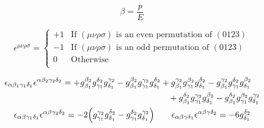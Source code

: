 \begin{equation*}
        \beta = \frac{p}{E}
\end{equation*}

\begin{equation*}
        \epsilon^{\mu\nu\rho\sigma} = \begin{cases}
                +1 &\text{If $(\mu\nu\rho\sigma)$ is an even permutation of $(0123)$} \\
                -1 &\text{If $(\mu\nu\rho\sigma)$ is an odd permutation of $(0123)$} \\
                0  &\text{Otherwise} \\
        \end{cases}
\end{equation*}

\begin{gather*}
    \begin{multlined}
        \epsilon_{\alpha\beta_1\gamma_1\delta_1}\epsilon^{\alpha\beta_2\gamma_2\delta_2}
        =
        + g^{\beta_2}_{\beta_1}g^{\delta_2}_{\gamma_1}g^{\gamma_2}_{\delta_1}
        - g^{\beta_2}_{\beta_1}g^{\gamma_2}_{\gamma_1}g^{\delta_2}_{\delta_1}
        + g^{\gamma_2}_{\beta_1}g^{\beta_2}_{\gamma_1}g^{\delta_2}_{\delta_1}
        - g^{\gamma_2}_{\beta_1}g^{\delta_2}_{\gamma_1}g^{\beta_2}_{\delta_1}
        \\
        + g^{\delta_2}_{\beta_1}g^{\gamma_2}_{\gamma_1}g^{\beta_2}_{\delta_1}
        - g^{\delta_2}_{\beta_1}g^{\beta_2}_{\gamma_1}g^{\gamma_2}_{\delta_1}
    \end{multlined}
    \\
    \epsilon_{\alpha\beta\gamma_1\delta_1}\epsilon^{\alpha\beta\gamma_2\delta_2} = -2\qty(g_{\gamma_1}^{\gamma_2}g_{\delta_1}^{\delta_2} - g_{\gamma_1}^{\delta_2}g_{\delta_1}^{\gamma_2})
    \qquad
    \epsilon_{\alpha\beta\gamma\delta_1}\epsilon^{\alpha\beta\gamma\delta_2} = -6g_{\delta_1}^{\delta_2}
\end{gather*}
